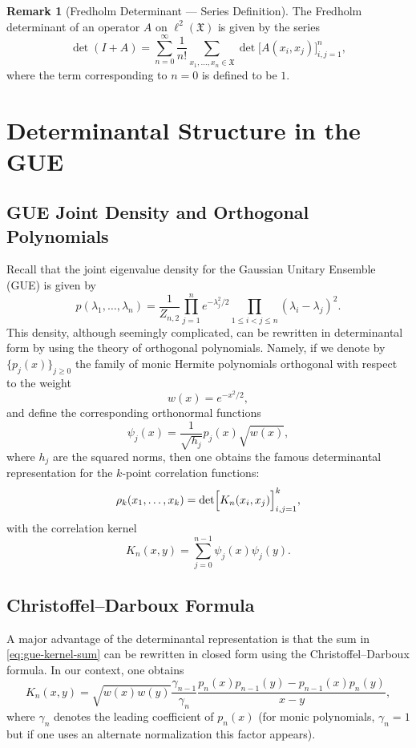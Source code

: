 \documentclass[letterpaper,11pt,oneside,reqno]{article}
\numberwithin{equation}{section}
\theoremstyle{definition}
\newtheorem{remark}[proposition]{Remark}
\begin{document}
\begin{remark}[Fredholm Determinant --- Series Definition]
	The Fredholm determinant of an operator $A$ on $\ell^2(\mathfrak{X})$ is given by the series
	\[
	\det(I+A)=\sum_{n=0}^\infty \frac{1}{n!}\sum_{x_1,\dots,x_n\in\mathfrak{X}} \det\bigl[A(x_i,x_j)\bigr]_{i,j=1}^n,
	\]
	where the term corresponding to $n=0$ is defined to be $1$.
\end{remark}


\section{Determinantal Structure in the GUE}
\label{sec:gue-dpp}
\subsection{GUE Joint Density and Orthogonal Polynomials}
Recall that the joint eigenvalue density for the Gaussian Unitary Ensemble (GUE) is given by
\begin{equation}
\label{eq:gue-joint-density}
p(\lambda_1,\dots,\lambda_n)=\frac{1}{Z_{n,2}}\prod_{j=1}^n e^{-\lambda_j^2/2}\prod_{1\le i<j\le n} (\lambda_i-\lambda_j)^2.
\end{equation}
This density, although seemingly complicated, can be rewritten in determinantal form by using the theory of orthogonal polynomials. Namely, if we denote by $\{p_j(x)\}_{j\ge0}$ the family of monic Hermite polynomials orthogonal with respect to the weight
\[
w(x)=e^{-x^2/2},
\]
and define the corresponding orthonormal functions
\[
\psi_j(x)=\frac{1}{\sqrt{h_j}}p_j(x) \sqrt{w(x)},
\]
where $h_j$ are the squared norms, then one obtains the famous determinantal representation for the $k$-point correlation functions:
\begin{equation}
\label{eq:gue-correlation}
\rho_k(x_1,\dots,x_k)=\det\Bigl[K_n(x_i,x_j)\Bigr]_{i,j=1}^k,
\end{equation}
with the correlation kernel
\begin{equation}
\label{eq:gue-kernel-sum}
K_n(x,y)=\sum_{j=0}^{n-1}\psi_j(x)\psi_j(y).
\end{equation}

\subsection{Christoffel--Darboux Formula}
A major advantage of the determinantal representation is that the sum in \eqref{eq:gue-kernel-sum} can be rewritten in closed form using the Christoffel--Darboux formula. In our context, one obtains
\begin{equation}
\label{eq:CD}
K_n(x,y)=\sqrt{w(x)w(y)}\frac{\gamma_{n-1}}{\gamma_n}\frac{p_n(x)p_{n-1}(y)-p_{n-1}(x)p_n(y)}{x-y},
\end{equation}
where $\gamma_n$ denotes the leading coefficient of $p_n(x)$ (for monic polynomials, $\gamma_n=1$ but if one uses an alternate normalization this factor appears).
\end{document}
